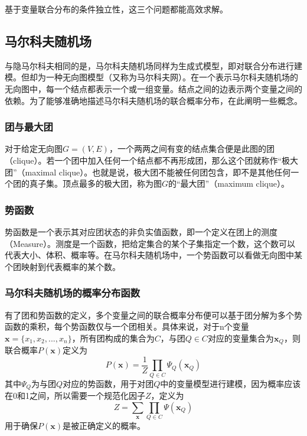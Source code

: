 基于变量联合分布的条件独立性，这三个问题都能高效求解。

\subsection{马尔科夫随机场}

与隐马尔科夫相同的是，马尔科夫随机场同样为生成式模型，即对联合分布进行建模。但却为一种无向图模型（又称为马尔科夫网）。在一个表示马尔科夫随机场的无向图中，每一个结点都表示一个或一组变量。结点之间的边表示两个变量之间的依赖。为了能够准确地描述马尔科夫随机场的联合概率分布，在此阐明一些概念。

\subsubsection{团与最大团}
对于给定无向图\(G = (V,E)\)，一个两两之间有变的结点集合便是此图的团（clique）。若一个团中加入任何一个结点都不再形成团，那么这个团就称作“极大团”（maximal clique）。也就是说，极大团不能被任何团包含，即不是其他任何一个团的真子集。顶点最多的极大团，称为图\(G\)的“最大团”（maximum clique）。
\subsubsection{势函数}
势函数是一个表示其对应团状态的非负实值函数，即一个定义在团上的测度（Measure）。测度是一个函数，把给定集合的某个子集指定一个数，这个数可以代表大小、体积、概率等。在马尔科夫随机场中，一个势函数可以看做无向图中某个团映射到代表概率的某个数。

\subsubsection{马尔科夫随机场的概率分布函数}
有了团和势函数的定义，多个变量之间的联合概率分布便可以基于团分解为多个势函数的乘积，每个势函数仅与一个团相关。具体来说，对于n个变量\(\boldsymbol{x} = \{x_1, x_2, ... ,x_n\}\)，所有团构成的集合为\(C\)，与团\(Q\in C\)对应的变量集合为\(\boldsymbol{x}_Q \)，则联合概率\(P(\boldsymbol{x})\)定义为
\begin{equation}P(\boldsymbol{x}) = \frac{1}{Z} \prod_{Q\in C} \Psi_Q (\boldsymbol{x}_Q)\end{equation}
其中\(\Psi_Q\)为与团\(Q\)对应的势函数，用于对团\(Q\)中的变量模型进行建模，因为概率应该在0和1之间，所以需要一个规范化因子\(Z\)，定义为
\begin{equation}Z= \sum_{\boldsymbol{x}} \prod_{Q \in C} \Psi (\boldsymbol{x}_Q)\end{equation}
用于确保\(P(\boldsymbol{x})\)是被正确定义的概率。

